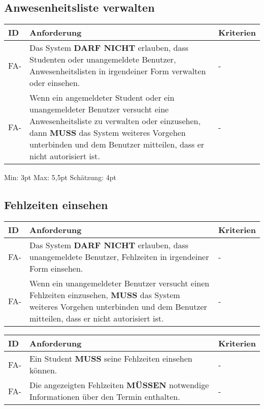 \newpage

\subsection{Anwesenheitsliste verwalten}

\begin{tabular} {|p{}|p{11cm}|p{}|}
	\hline
	ID & Anforderung & Kriterien \\
	\hline
	FA-
	& Das System \textbf{DARF NICHT} erlauben, dass Studenten oder unangemeldete Benutzer, Anwesenheitslisten in irgendeiner Form verwalten oder einsehen. 
	& - \\
	\hline
	FA-
	& Wenn ein angemeldeter Student oder ein unangemeldeter Benutzer versucht eine Anwesenheitsliste zu verwalten oder einzusehen, dann \textbf{MUSS} das System weiteres Vorgehen unterbinden und dem Benutzer mitteilen, dass er nicht autorisiert ist.
	& - \\ 
	\hline
\end{tabular}
Min: 3pt
Max: 5,5pt
Schätzung: 4pt

\newpage

\subsection{Fehlzeiten einsehen}

\begin{tabular} {|p{}|p{11cm}|p{}|}
	\hline
	ID & Anforderung & Kriterien \\
	\hline
	FA-
	& Das System \textbf{DARF NICHT} erlauben, dass unangemeldete Benutzer, Fehlzeiten in irgendeiner Form einsehen. 
	& - \\
	\hline
	FA-
	& Wenn ein unangemeldeter Benutzer versucht einen Fehlzeiten einzusehen, \textbf{MUSS} das System weiteres Vorgehen unterbinden und dem Benutzer mitteilen, dass er nicht autorisiert ist.
	& - \\ 
	\hline
\end{tabular}

\begin{tabular} {|p{}|p{11cm}|p{}|}
	\hline
	ID & Anforderung & Kriterien \\
	\hline
	FA-
	& Ein Student \textbf{MUSS} seine Fehlzeiten einsehen können. 
	& - \\
	\hline
	FA-
	& Die angezeigten Fehlzeiten \textbf{MÜSSEN} notwendige Informationen über den Termin enthalten.
	& - \\ 
	\hline
\end{tabular}

